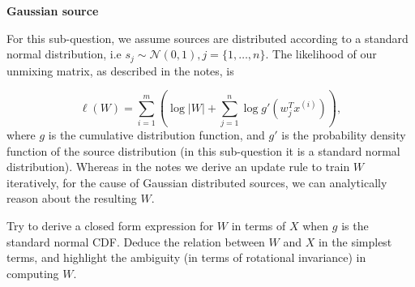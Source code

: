 \item {} \textbf{Gaussian source}

For this sub-question, we assume sources are distributed according to a standard normal distribution, i.e $s_j \sim \mathcal{N}(0,1), j=\{1,\ldots,n\}.$ The likelihood of our unmixing matrix, as described in the notes, is
    
$$\ell(W) = \sum_{i=1}^m\left(\log|W| + \sum_{j=1}^n \log g'(w_j^Tx^{(i)})\right),$$ where $g$ is the cumulative distribution function, and $g'$ is the probability density function of the source distribution (in this sub-question it is a standard normal distribution). Whereas in the notes we derive an update rule to train $W$ iteratively, for the cause of Gaussian distributed sources, we can analytically reason about the resulting $W$.
    
Try to derive a closed form expression for $W$ in terms of $X$ when $g$ is the standard normal CDF. Deduce the relation between $W$ and $X$ in the simplest terms, and highlight the ambiguity (in terms of rotational invariance) in computing $W$. 
    
